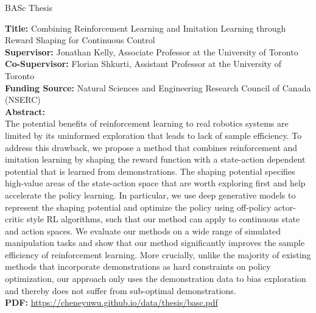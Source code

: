 \documentclass{cv}
\begin{document}
\begin{rSection}{BASc Thesis}
  \item {\bf Title:} Combining Reinforcement Learning and Imitation Learning through Reward Shaping for Continuous Control\\
  {\bf Supervisor:} Jonathan Kelly, Associate Professor at the University of Toronto\\
  {\bf Co-Supervisor:} Florian Shkurti, Assistant Professor at the University of Toronto\\
  {\bf Funding Source:} Natural Sciences and Engineering Research Council of Canada (NSERC)\\
  {\bf Abstract:}\\
  The potential benefits of reinforcement learning to real robotics systems are limited by its uninformed exploration that leads to lack of sample efficiency. To address this drawback, we propose a method that combines reinforcement and imitation learning by shaping the reward function with a state-action dependent potential that is learned from demonstrations. The shaping potential specifies high-value areas of the state-action space that are worth exploring first and help accelerate the policy learning. In particular, we use deep generative models to represent the shaping potential and optimize the policy using off-policy actor-critic style RL algorithms, such that our method can apply to continuous state and action spaces. We evaluate our methods on a wide range of simulated manipulation tasks and show that our method significantly improves the sample efficiency of reinforcement learning. More crucially, unlike the majority of existing methods that incorporate demonstrations as hard constraints on policy optimization, our approach only uses the demonstration data to bias exploration and thereby does not suffer from sub-optimal demonstrations.\\
  {\bf PDF: } \href{https://cheneyuwu.github.io/data/thesis/basc.pdf}{https://cheneyuwu.github.io/data/thesis/basc.pdf}
\end{rSection}
\end{document}
